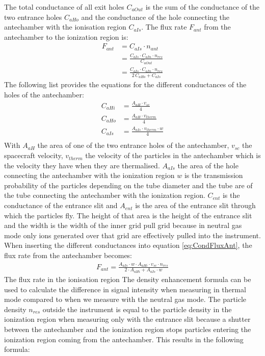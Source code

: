 		The total conductance of all exit holes $C_{aOut}$ is the sum of the conductance of the two entrance holes $C_{aHo}$ and the conductance of the hole connecting the antechamber with the ionisation region $C_{aIs}$. The flux rate $F_{ant}$ from the antechamber to the ionization region is:
		\begin{align}
			F_{ant} &= C_{aIs} \cdot n_{ant} \nonumber \\
					&= \frac{C_{aIs}\cdot C_{aIn}\cdot n_{res}}{C_{aOut}} \nonumber \\
					&= \frac{C_{aIs}\cdot C_{aIn}\cdot n_{res}}{2\,C_{aHo} + C_{aIs}}
			\label{eq:CondFluxAnt}
		\end{align}
		The following list provides the equations for the different conductances of the holes of the antechamber:
		\begin{align*}
			C_{aHi} 	&=\frac{A_{aH}\cdot v_{sc}}{4}\\
			C_{aHo} 	&=\frac{A_{aH}\cdot v_{therm}}{4}\\
			C_{aIs} 	&=\frac{A_{aIs}\cdot v_{therm}\cdot w}{4}\\
		\end{align*}
		With $A_{aH}$ the area of one of the two entrance holes of the antechamber, $v_{sc}$ the spacecraft velocity, $v_{therm}$ the velocity of the particles in the antechamber which is the velocity they have when they are thermalised. $A_{aIs}$ the area of the hole connecting the antechamber with the ionization region $w$ is the transmission probability of the particles depending on the tube diameter and the tube are of the tube connecting the antechamber with the ionization region. $C_{ent}$ is the conductance of the entrance slit and $A_{ent}$ is the area of the entrance slit through which the particles fly. The height of that area is the height of the entrance slit and the width is the width of the inner grid pull grid because in neutral gas mode only ions generated over that grid are effectively pulled into the instrument.\\		
		When inserting the different conductances into equation \eqref{eq:CondFluxAnt}, the flux rate from the antechamber becomes:
		\begin{align}
			F_{ant} = \frac{A_{aIs}\cdot w\cdot A_{aHi}\cdot v_{sc}\cdot n_{res}}{2\cdot A_{aHi} +A_{aIs}\cdot w}
			\label{eq:condAntEff}
		\end{align}
		The flux rate in the ionisation region
		The density enhancement formula can be used to calculate the difference in signal intensity when measuring in thermal mode compared to when we measure with the neutral gas mode. The particle density $n_{res}$ outside the instrument is equal to the particle density in the ionization region when measuring only with the entrance slit because a shutter between the antechamber and the ionization region stops particles entering the ionization region coming from the antechamber. This results in the following formula: %
